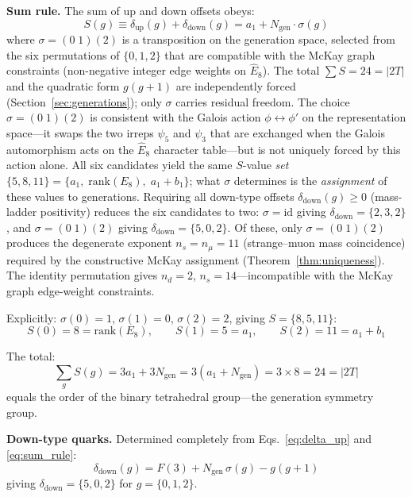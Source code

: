 \documentclass[12pt,a4paper]{article}
\theoremstyle{definition}
\begin{document}
\textbf{Sum rule.} The sum of up and down offsets obeys:
\begin{equation}
\boxed{S(g) \equiv \delta_{\text{up}}(g) + \delta_{\text{down}}(g) = a_1 + N_{\text{gen}} \cdot \sigma(g)}
\label{eq:sum_rule}
\end{equation}
where $\sigma = (0\;1)(2)$ is a transposition on the generation space, selected from the six permutations of $\{0,1,2\}$ that are compatible with the McKay graph constraints (non-negative integer edge weights on $\hat{E}_8$). The total $\sum S = 24 = |2T|$ and the quadratic form $g(g+1)$ are independently forced (Section~\ref{sec:generations}); only $\sigma$ carries residual freedom. The choice $\sigma = (0\;1)(2)$ is consistent with the Galois action $\phi \leftrightarrow \phi'$ on the representation space---it swaps the two irreps $\psi_5$ and $\psi_3$ that are exchanged when the Galois automorphism acts on the $\hat{E}_8$ character table---but is not uniquely forced by this action alone. All six candidates yield the same $S$-value \emph{set} $\{5, 8, 11\} = \{a_1,\;\text{rank}(E_8),\; a_1 + b_1\}$; what $\sigma$ determines is the \emph{assignment} of these values to generations.  Requiring all down-type offsets $\delta_{\mathrm{down}}(g) \geq 0$ (mass-ladder positivity) reduces the six candidates to two: $\sigma = \mathrm{id}$ giving $\delta_{\mathrm{down}} = \{2, 3, 2\}$, and $\sigma = (0\;1)(2)$ giving $\delta_{\mathrm{down}} = \{5, 0, 2\}$.  Of these, only $\sigma = (0\;1)(2)$ produces the degenerate exponent $n_s = n_\mu = 11$ (strange--muon mass coincidence) required by the constructive McKay assignment (Theorem~\ref{thm:uniqueness}).  The identity permutation gives $n_d = 2$, $n_s = 14$---incompatible with the McKay graph edge-weight constraints.

Explicitly: $\sigma(0) = 1$, $\sigma(1) = 0$, $\sigma(2) = 2$, giving $S = \{8, 5, 11\}$:
\begin{equation}
S(0) = 8 = \text{rank}(E_8), \qquad S(1) = 5 = a_1, \qquad S(2) = 11 = a_1 + b_1
\end{equation}

The total:
\begin{equation}
\sum_g S(g) = 3a_1 + 3 N_{\text{gen}} = 3(a_1 + N_{\text{gen}}) = 3 \times 8 = 24 = |2T|
\end{equation}
equals the order of the binary tetrahedral group---the generation symmetry group.

\textbf{Down-type quarks.} Determined completely from Eqs.~\eqref{eq:delta_up} and \eqref{eq:sum_rule}:
\begin{equation}
\boxed{\delta_{\text{down}}(g) = F(3) + N_{\text{gen}}\,\sigma(g) - g(g+1)}
\label{eq:delta_down}
\end{equation}
giving $\delta_{\text{down}} = \{5, 0, 2\}$ for $g = \{0, 1, 2\}$.
\end{document}

